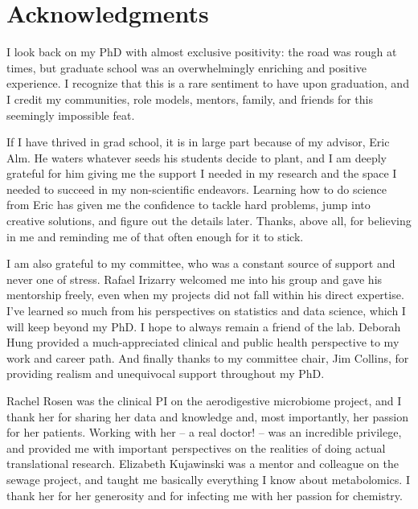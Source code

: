 \section*{Acknowledgments}

\begin{singlespace}

I look back on my PhD with almost exclusive positivity: the road was rough at times, but graduate school was an overwhelmingly enriching and positive experience.
I recognize that this is a rare sentiment to have upon graduation, and I credit my communities, role models, mentors, family, and friends for this seemingly impossible feat.

If I have thrived in grad school, it is in large part because of my advisor, Eric Alm.
He waters whatever seeds his students decide to plant, and I am deeply grateful for him giving me the support I needed in my research and the space I needed to succeed in my non-scientific endeavors.
Learning how to do science from Eric has given me the confidence to tackle hard problems, jump into creative solutions, and figure out the details later.
Thanks, above all, for believing in me and reminding me of that often enough for it to stick.

I am also grateful to my committee, who was a constant source of support and never one of stress.
Rafael Irizarry welcomed me into his group and gave his mentorship freely, even when my projects did not fall within his direct expertise.
I've learned so much from his perspectives on statistics and data science, which I will keep beyond my PhD.
I hope to always remain a friend of the lab.
Deborah Hung provided a much-appreciated clinical and public health perspective to my work and career path.
And finally thanks to my committee chair, Jim Collins, for providing realism and unequivocal support throughout my PhD.

Rachel Rosen was the clinical PI on the aerodigestive microbiome project, and I thank her for sharing her data and knowledge and, most importantly, her passion for her patients.
Working with her -- a real doctor! -- was an incredible privilege, and provided me with important perspectives on the realities of doing actual translational research.
Elizabeth Kujawinski was a mentor and colleague on the sewage project, and taught me basically everything I know about metabolomics. I thank her for her generosity and for infecting me with her passion for chemistry.


\end{singlespace}
